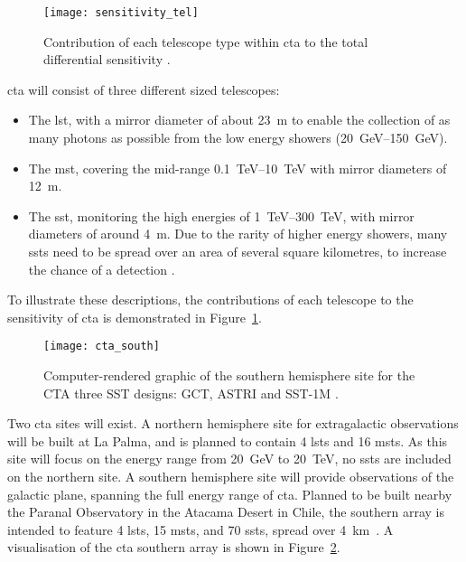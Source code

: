 \begin{figure}
	\centering\texttt{[image: sensitivity\_tel]} 
	\caption[Differential sensitivity of the different CTA telescope types.]{Contribution of each telescope type within \gls{cta} to the total differential sensitivity \cite{Marano2014}.}
	\label{fig:sensitivity_tel}
\end{figure}

\gls{cta} will consist of three different sized telescopes:
\begin{itemize}
\item The \gls{lst}, with a mirror diameter of about \SI{23}{m} to enable the collection of as many photons as possible from the low energy showers (\SIrange{20}{150}{GeV}).
\item The \gls{mst}, covering the mid-range \SIrange{0.1}{10}{TeV} with mirror diameters of \SI{12}{m}.
\item The \gls{sst}, monitoring the high energies of \SIrange{1}{300}{TeV}, with mirror diameters of around \SI{4}{m}. Due to the rarity of higher energy showers, many \glspl{sst} need to be spread over an area of several square kilometres, to increase the chance of a detection \cite{Acharya2013}.
\end{itemize}
To illustrate these descriptions, the contributions of each telescope to the sensitivity of \gls{cta} is demonstrated in Figure~\ref{fig:sensitivity_tel}.

\begin{figure}
	\centering\texttt{[image: cta\_south]} 
	\caption[The southern-hemisphere Cherenkov Telescope Array.]{Computer-rendered graphic of the southern hemisphere site for the CTA three SST designs: GCT, ASTRI and SST-1M \cite{cta-sst}.}
	\label{fig:cta_south}
\end{figure}

Two \gls{cta} sites will exist. A northern hemisphere site for extragalactic observations will be built at La Palma, and is planned to contain 4 \glspl{lst} and 16 \glspl{mst}. As this site will focus on the energy range from \SI{20}{GeV} to \SI{20}{TeV}, no \glspl{sst} are included on the northern site. A southern hemisphere site will provide observations of the galactic plane, spanning the full energy range of \gls{cta}. Planned to be built nearby the Paranal Observatory in the Atacama Desert in Chile, the southern array is intended to feature 4 \glspl{lst}, 15 \glspl{mst}, and 70 \glspl{sst}, spread over \SI{4}{km \squared}. A visualisation of the \gls{cta} southern array is shown in Figure~\ref{fig:cta_south}.

